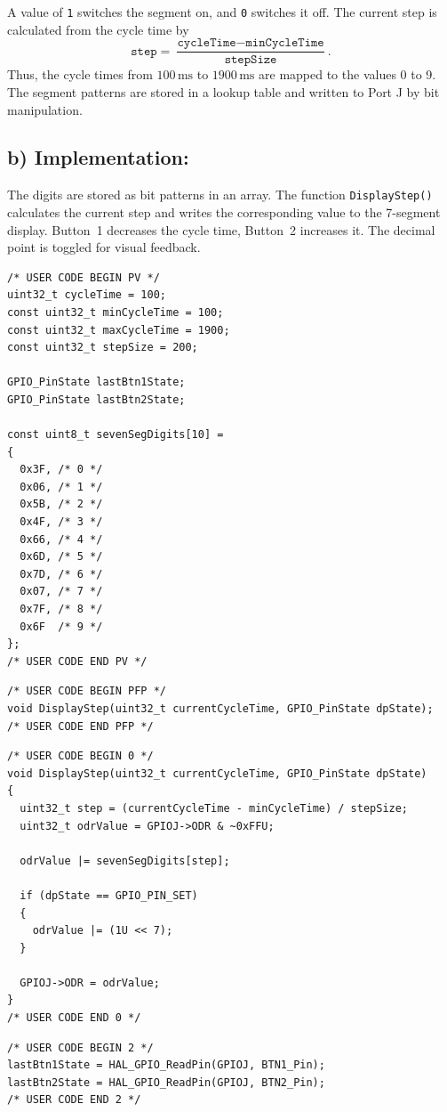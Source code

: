 A value of \texttt{1} switches the segment on, and \texttt{0} switches it off.
The current step is calculated from the cycle time by
\[
	\texttt{step}=\frac{\texttt{cycleTime}-\texttt{minCycleTime}}{\texttt{stepSize}}.
\]
Thus, the cycle times from $100\,\text{ms}$ to $1900\,\text{ms}$ are mapped to the values 0 to 9.
The segment patterns are stored in a lookup table and written to Port J by bit manipulation.

\subsection{b) Implementation:}

The digits are stored as bit patterns in an array.
The function \texttt{DisplayStep()} calculates the current step and writes the corresponding value to the 7-segment display.
Button~1 decreases the cycle time, Button~2 increases it. The decimal point is toggled for visual feedback.

\begin{lstlisting}
/* USER CODE BEGIN PV */
uint32_t cycleTime = 100;
const uint32_t minCycleTime = 100;
const uint32_t maxCycleTime = 1900;
const uint32_t stepSize = 200;

GPIO_PinState lastBtn1State;
GPIO_PinState lastBtn2State;

const uint8_t sevenSegDigits[10] =
{
  0x3F, /* 0 */
  0x06, /* 1 */
  0x5B, /* 2 */
  0x4F, /* 3 */
  0x66, /* 4 */
  0x6D, /* 5 */
  0x7D, /* 6 */
  0x07, /* 7 */
  0x7F, /* 8 */
  0x6F  /* 9 */
};
/* USER CODE END PV */
\end{lstlisting}

\begin{lstlisting}
/* USER CODE BEGIN PFP */
void DisplayStep(uint32_t currentCycleTime, GPIO_PinState dpState);
/* USER CODE END PFP */
\end{lstlisting}

\begin{lstlisting}
/* USER CODE BEGIN 0 */
void DisplayStep(uint32_t currentCycleTime, GPIO_PinState dpState)
{
  uint32_t step = (currentCycleTime - minCycleTime) / stepSize;
  uint32_t odrValue = GPIOJ->ODR & ~0xFFU;

  odrValue |= sevenSegDigits[step];

  if (dpState == GPIO_PIN_SET)
  {
    odrValue |= (1U << 7);
  }

  GPIOJ->ODR = odrValue;
}
/* USER CODE END 0 */
\end{lstlisting}

\begin{lstlisting}
/* USER CODE BEGIN 2 */
lastBtn1State = HAL_GPIO_ReadPin(GPIOJ, BTN1_Pin);
lastBtn2State = HAL_GPIO_ReadPin(GPIOJ, BTN2_Pin);
/* USER CODE END 2 */
\end{lstlisting}

